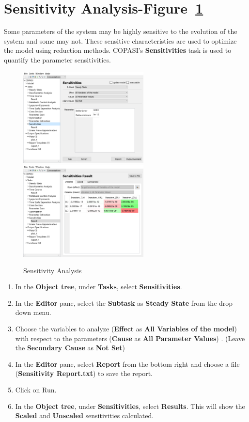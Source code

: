 \documentclass[10pt]{article}
\theoremstyle{definition}
\theoremstyle{remark}
\begin{document}
	\section{Sensitivity Analysis-Figure~\ref{11png}}
	Some parameters of the system may be highly sensitive to the evolution of the system and some may not. These sensitive characteristics are used to optimize the model using reduction methods. COPASI's \textbf{Sensitivities} task is used to quantify the parameter sensitivities.
	\begin{figure}[!htb]
		\centering
		\includegraphics[height=5cm]{Images/11a.png}
		\includegraphics[height=5cm]{Images/11b.png}
		\caption{Sensitivity Analysis}
		\label{11png}
	\end{figure}
	\begin{enumerate}[start=1]\def\makelabel{\textbf{Step}~}
		\item In the \textbf{Object tree}, under \textbf{Tasks}, select \textbf{Sensitivities}.
		\item In the \textbf{Editor} pane, select the  \textbf{Subtask} as \textbf{Steady State} from the drop down menu.
		\item Choose the variables to analyze (\textbf{Effect} as \textbf{All Variables of the model}) with respect to the parameters (\textbf{Cause} as \textbf{All Parameter Values}) . (Leave the \textbf{Secondary Cause} as \textbf{Not Set})
		\item In the \textbf{Editor} pane, select \textbf{Report} from the bottom right and choose a file (\textbf{Sensitivity Report.txt}) to save the report.
		\item Click on Run.
		\item In the \textbf{Object tree}, under \textbf{Sensitivities}, select \textbf{Results}. This will show the \textbf{Scaled} and \textbf{Unscaled} sensitivities calculated.
	\end{enumerate}
	
\end{document}
